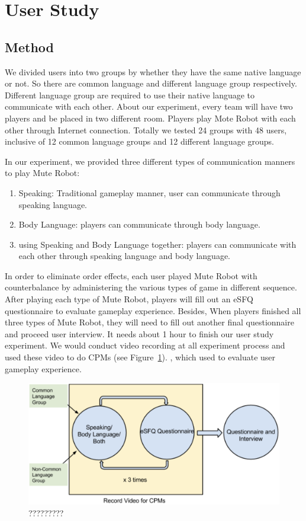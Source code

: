 

\section{User Study}

\subsection{Method}

We divided users into two groups by whether they have the same native language or not. So there are common language and different language group respectively. Different language group are required to use their native language to communicate with each other. About our experiment, every team will have two players and be placed in two different room. Players play Mote Robot with each other through Internet connection. Totally we tested 24 groups with 48 users, inclusive of 12 common language groups and 12 different language groups.

In our experiment, we provided three different types of communication manners to play Mute Robot:
\begin{enumerate}
    \item Speaking: 
    Traditional gameplay manner, user can communicate through speaking language.
    \item Body Language: 
    players can communicate through body language.
    \item using Speaking and Body Language together: 
    players can communicate with each other through speaking language and body language.
\end{enumerate}

In order to eliminate order effects, each user played Mute Robot with counterbalance by administering the various types of game in different sequence. After playing each type of Mute Robot, players will fill out an eSFQ\cite{eSFQ} questionnaire to evaluate gameplay experience. Besides, When players finished all three types of Mute Robot, they will need to fill out another final questionnaire and proceed user interview. It needs about 1 hour to finish our user study experiment. We would conduct video recording at all experiment process and used these video to do CPMs\cite{CPMs} (see Figure~\ref{fig:US1}). , which used to evaluate user gameplay experience.

\begin{figure}[!h]
\centering
\includegraphics[width=0.9\columnwidth]{Figures/US_F1.png}
\caption{?????????}
\label{fig:US1}
\end{figure}




